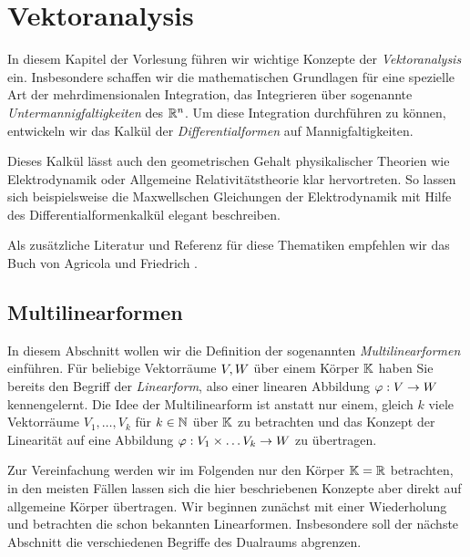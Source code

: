 \chapter{Vektoranalysis}
\label{\detokenize{vektoranalysis/vektoranalysis:vektoranalysis}}\label{\detokenize{vektoranalysis/vektoranalysis::doc}}
\par
In diesem Kapitel der Vorlesung führen wir wichtige Konzepte der \emph{Vektoranalysis} ein.
Insbesondere schaffen wir die mathematischen Grundlagen für eine spezielle Art der mehrdimensionalen Integration, das Integrieren über sogenannte \emph{Untermannigfaltigkeiten} des \(\mathbb{R}^n\).
Um diese Integration durchführen zu können, entwickeln wir das Kalkül der \emph{Differentialformen} auf Mannigfaltigkeiten.

\par
Dieses Kalkül lässt auch den geometrischen Gehalt physikalischer Theorien wie Elektrodynamik oder Allgemeine Relativitätstheorie klar hervortreten.
So lassen sich beispielsweise die Maxwellschen Gleichungen der Elektrodynamik mit Hilfe des Differentialformenkalkül elegant beschreiben.

\par
Als zusätzliche Literatur und Referenz für diese Thematiken empfehlen wir das Buch von Agricola und Friedrich \cite{AF13}.


\section{Multilinearformen}
\label{\detokenize{vektoranalysis/multilinear:multilinearformen}}\label{\detokenize{vektoranalysis/multilinear::doc}}
\par
In diesem Abschnitt wollen wir die Definition der sogenannten \emph{Multilinearformen} einführen.
Für beliebige Vektorräume \(V, W\) über einem Körper \(\mathbb{K}\) haben Sie bereits den Begriff der \emph{Linearform}, also einer linearen Abbildung \(\varphi:V\rightarrow W\) kennengelernt.
Die Idee der Multilinearform ist anstatt nur einem, gleich \(k\) viele Vektorräume \(V_1,\ldots,V_k\) für \(k \in \mathbb{N}\) über \(\mathbb{K}\) zu betrachten und das Konzept der Linearität auf eine Abbildung \(\varphi:V_1\times\ldots V_k\rightarrow W\) zu übertragen.

\par
Zur Vereinfachung werden wir im Folgenden nur den Körper \(\mathbb{K}=\mathbb{R}\) betrachten, in den meisten Fällen lassen sich die hier beschriebenen Konzepte aber direkt auf allgemeine Körper übertragen.
Wir beginnen zunächst mit einer Wiederholung und betrachten die schon bekannten Linearformen.
Insbesondere soll der nächste Abschnitt die verschiedenen Begriffe des Dualraums abgrenzen.


